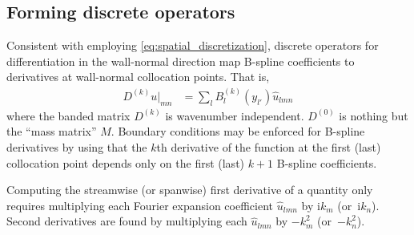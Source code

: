 \documentclass[letterpaper,11pt,nointlimits,reqno,draft]{amsart}
\newcommand{\ii}{\ensuremath{\mathrm{i}}}
\begin{document}
\subsection{Forming discrete operators}
\label{sec:formingoperators}

Consistent with employing \eqref{eq:spatial_discretization}, discrete operators
for differentiation in the wall-normal direction map B-spline coefficients to
derivatives at wall-normal collocation points.  That is,
\begin{align}
  D^{(k)} u\bigr|_{m n}
&= \sum_{l} B^{(k)}_l\!\left(y_{l'}\right)
   \hat{u}_{l m n}
\end{align}
where the banded matrix $D^{(k)}$ is wavenumber independent.  $D^{(0)}$ is
nothing but the ``mass matrix'' $M$.  Boundary conditions may be enforced for
B-spline derivatives by using that the $k$th derivative of the function at the
first (last) collocation point depends only on the first (last) $k+1$ B-spline
coefficients.

Computing the streamwise (or spanwise) first derivative of a quantity only
requires multiplying each Fourier expansion coefficient $\hat{u}_{l m n}$ by
$\ii k_{m}$ (or~$\ii k_{n}$).  Second derivatives are found by multiplying each
$\hat{u}_{l m n}$ by $-k_{m}^2$ (or~$-k_{n}^2$).
\end{document}
